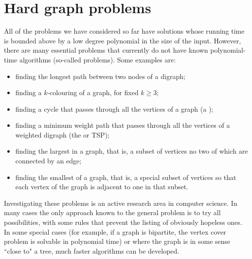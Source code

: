 \chapter{Hard graph problems}%
\label{sec:hardgraph}
All of the problems we have considered so far have solutions whose running time is  bounded above by a low
degree polynomial in the size of the input. However, there are many
essential problems that currently do not have known polynomial-time
algorithms (so-called  problems). Some examples
are:
\begin{itemize}
\item finding the longest path between two nodes of a digraph;
\item finding a $k$-colouring of a graph, for fixed $k \geq 3$;
\item finding a cycle that passes through all the vertices of
a graph (a );
\item finding a
minimum weight path that passes through all the vertices of a weighted
digraph (the  or TSP);
\item finding the largest  in a graph, that is, 
a subset of vertices no two of which are connected by an edge;
\item finding the smallest  of a graph, that is, a special subset of
vertices so that each vertex of the graph is adjacent to one in that
subset. 
\end{itemize}

Investigating these problems is an active research area in computer
science. In many cases the only approach known to the general problem is to try
all possibilities, with some rules that prevent the listing of obviously
hopeless ones. In some special cases (for example, if a graph is bipartite, the vertex cover problem is solvable in polynomial time)
or where the graph is in some sense ``close to" a tree, much faster algorithms can be developed.

